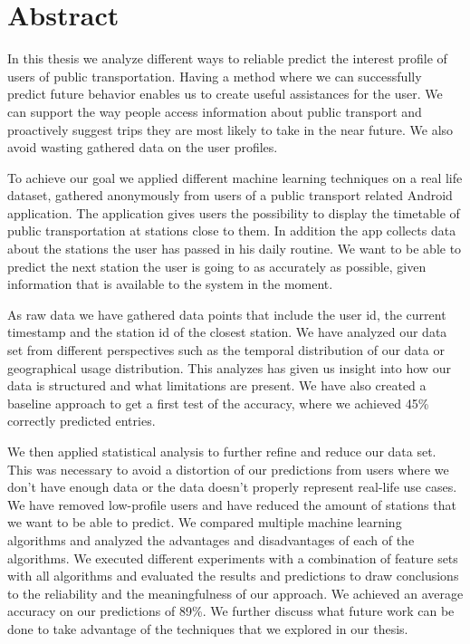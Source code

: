 \newpage
\chapter*{\centering Abstract}

In this thesis we analyze different ways to reliable predict the interest profile of users of public transportation. Having a method where we can successfully predict future behavior enables us to create useful assistances for the user. We can support the way people access information about public transport and proactively suggest trips they are most likely to take in the near future. We also avoid wasting gathered data on the user profiles.

To achieve our goal we applied different machine learning techniques on a real life dataset, gathered anonymously from users of a public transport related Android application. The application gives users the possibility to display the timetable of public transportation at stations close to them. In addition the app collects data about the stations the user has passed in his daily routine. We want to be able to predict the next station the user is going to as accurately as possible, given information that is available to the system in the moment.

As raw data we have gathered data points that include the user id, the current timestamp and the station id of the closest station. We have analyzed our data set from different perspectives such as the temporal distribution of our data or geographical usage distribution. This analyzes has given us insight into how our data is structured and what limitations are present. We have also created a baseline approach to get a first test of the accuracy, where we achieved 45\% correctly predicted entries.

We then applied statistical analysis to further refine and reduce our data set. This was necessary to avoid a distortion of our predictions from users where we don't have enough data or the data doesn't properly represent real-life use cases. We have removed low-profile users and have reduced the amount of stations that we want to be able to predict. We compared multiple machine learning algorithms and analyzed the advantages and disadvantages of each of the algorithms. We executed different experiments with a combination of feature sets with all algorithms and evaluated the results and predictions to draw conclusions to the reliability and the meaningfulness of our approach. We achieved an average accuracy on our predictions of 89\%. We further discuss what future work can be done to take advantage of the techniques that we explored in our thesis.

